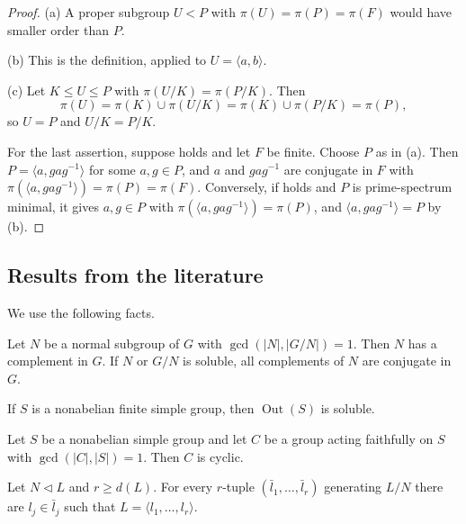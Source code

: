 \documentclass[11pt,colorlinks]{charlie}
\DeclareMathOperator{\Out}{Out}
\newcommand{\gen}[1]{\langle #1\rangle}
\begin{document}
\begin{proof}
(a) A proper subgroup $U<P$ with $\pi(U)=\pi(P)=\pi(F)$ would have smaller order than $P$.

(b) This is the definition, applied to $U=\gen{a,b}$.

(c) Let $K\le U\le P$ with $\pi(U/K)=\pi(P/K)$. Then
\[
 \pi(U)=\pi(K)\cup\pi(U/K)=\pi(K)\cup\pi(P/K)=\pi(P),
\]
so $U=P$ and $U/K=P/K$.

For the last assertion, suppose  holds and let $F$ be finite. Choose $P$ as in (a). Then $P=\gen{a,gag^{-1}}$ for some $a,g\in P$, and $a$ and $gag^{-1}$ are conjugate in $F$ with $\pi(\gen{a,gag^{-1}})=\pi(P)=\pi(F)$. Conversely, if  holds and $P$ is prime-spectrum minimal, it gives $a,g\in P$ with $\pi(\gen{a,gag^{-1}})=\pi(P)$, and $\gen{a,gag^{-1}}=P$ by (b).
\end{proof}

\subsection{Results from the literature}

We use the following facts.

\begin{theorem}\label{thm:sz}
Let $N$ be a normal subgroup of $G$ with $\gcd(|N|,|G/N|)=1$. Then $N$ has a complement in $G$. If $N$ or $G/N$ is soluble, all complements of $N$ are conjugate in $G$.
\end{theorem}

\begin{theorem}\label{thm:schreier}
If $S$ is a nonabelian finite simple group, then $\Out(S)$ is soluble.
\end{theorem}

\begin{theorem}[{\cite[Theorem~5.1]{SV}}]\label{thm:coprime}
Let $S$ be a nonabelian simple group and let $C$ be a group acting faithfully on $S$ with $\gcd(|C|,|S|)=1$. Then $C$ is cyclic.
\end{theorem}

\begin{theorem}\label{thm:gaschutz}
Let $N\lhd L$ and $r\ge d(L)$. For every $r$-tuple $(\bar l_1,\dots,\bar l_r)$ generating $L/N$ there are $l_j\in\bar l_j$ such that $L=\gen{l_1,\dots,l_r}$.
\end{theorem}
\end{document}
